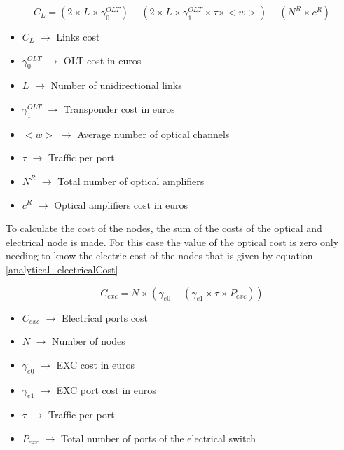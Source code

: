 \begin{equation}
C_L = \left(2 \times L \times \gamma_0^{OLT}\right) + \left(2 \times L \times \gamma_1^{OLT} \times \tau \times <w>\right) + \left(N^R \times c^R\right)
\label{analytical_linkCosts}
\end{equation}

\begin{itemize}
\item{$C_L$				$\rightarrow$	Links cost}
\item{$\gamma_0^{OLT}$	$\rightarrow$	OLT cost in euros}
\item{$L$				$\rightarrow$	Number of unidirectional links}
\item{$\gamma_1^{OLT}$	$\rightarrow$	Transponder cost in euros}
\item{$<w>$             $\rightarrow$   Average number of optical channels}
\item{$\tau$		    $\rightarrow$	Traffic per port}
\item{$N^R$				$\rightarrow$	Total number of optical amplifiers}
\item{$c^R$				$\rightarrow$	Optical amplifiers cost in euros}
\end{itemize}


To calculate the cost of the nodes, the sum of the costs of the optical and electrical node is made. For this case the value of the optical cost is zero only needing to know the electric cost of the nodes that is given by equation \ref{analytical_electricalCost}

\begin{equation}
C_{exc} = N \times \left(\gamma_{e0} + \left(\gamma_{e1} \times \tau \times P_{exc} \right) \right)
\label{analytical_electricalCost}
\end{equation}

\begin{itemize}
\item{$C_{exc}$		$\rightarrow$	Electrical ports cost}
\item{$N$			$\rightarrow$	Number of nodes}
\item{$\gamma_{e0}$	$\rightarrow$	EXC cost in euros}
\item{$\gamma_{e1}$	$\rightarrow$	EXC port cost in euros}
\item{$\tau$		$\rightarrow$	Traffic per port}
\item{$P_{exc}$     $\rightarrow$   Total number of ports of the electrical switch}
\end{itemize}


